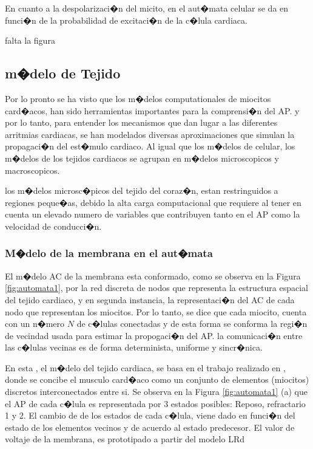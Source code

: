 En cuanto a la despolarizaci�n del micito, en el aut�mata celular se da en
funci�n de la probabilidad de excitaci�n de la c�lula cardiaca. 

falta la figura


\subsection{m�delo de Tejido}

Por lo pronto se ha visto que los m�delos computationales de miocitos card�acos,
han sido herramientas importantes para la comprensi�n del \ac{AP}. y por lo
tanto, para entender los mecanismos que dan lugar a las diferentes arritmias
cardiacas, se han modelados diversas aproximaciones que simulan la propagaci�n
del est�mulo cardiaco. Al igual que los m�delos de celular, los m�delos de los
tejidos cardiacos se agrupan en m�delos microscopicos y macroscopicos. 

los m�delos microsc�picos del tejido del coraz�n, estan restringuidos a
regiones peque�as, debido la alta carga computacional que requiere al tener en
cuenta un elevado numero de variables que contribuyen  tanto en el \ac{AP} como
la velocidad de conducci�n.


\subsubsection{M�delo de la membrana en el aut�mata}

El m�delo \ac{AC} de la membrana esta conformado, como se observa en la Figura
\ref{fig:automata1},  por la red discreta de nodos que representa la estructura
espacial del tejido cardiaco, y en segunda instancia, la representaci�n del \ac{AC} de cada nodo que representan los miocitos. Por lo tanto, se dice que cada miocito,
cuenta con un n�mero $N$ de c�lulas conectadas y de esta forma se
conforma la regi�n de vecindad  usada para  estimar la propogaci�n del \ac{AP}.
la comunicaci�n entre las c�lulas vecinas  es de forma determinista, uniforme  y
sincr�nica.

En esta \nombreDoc, el m�delo del tejido cardiaca, se basa en el 
trabajo realizado en \cite{Alonso-Atienza05}, donde se concibe el musculo
card�aco como un conjunto de elementos (miocitos) discretos interconectados
entre si. Se observa en la Figura \ref{fig:automata1} (a) que el \ac{AP} de
cada c�lula es representada por 3 estados posibles:  Reposo, refractario 1 y 2.
El cambio de  de los estados de cada c�lula, viene dado en funci�n del estado
de los elementos vecinos y de  acuerdo al estado predecesor. El valor de voltaje
de la membrana, es prototipado a partir del modelo \ac{LRd}
\cite{Alonso-Atienza05}



